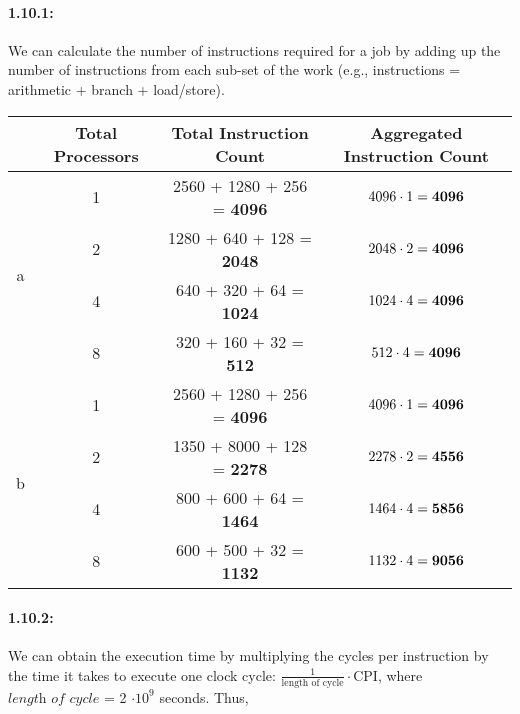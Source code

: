 \documentclass[a4paper]{article}
\begin{document}
\paragraph*{1.10.1:} We can calculate the number of instructions required for a job by adding up the number of instructions from each sub-set of the work (e.g., instructions = arithmetic + branch + load/store).

\begin{center}
\begin{tabular}{|c|c|c|c|c|c|}
\hline
& Total Processors & \multicolumn{2}{|c|}{Total Instruction Count} & \multicolumn{2}{|c|}{Aggregated Instruction Count}\\
\hline
\hline
\multirow{4}{*}{a} & 1 & \multicolumn{2}{|c|}{2560 + 1280 + 256 = {\bf4096}} & \multicolumn{2}{|c|}{$4096 \cdot 1 = {\bf4096}$}\\
& 2 & \multicolumn{2}{|c|}{1280 + 640 + 128 = {\bf2048}} & \multicolumn{2}{|c|}{$2048 \cdot 2 = {\bf4096}$}\\
& 4 & \multicolumn{2}{|c|}{640 + 320 + 64 = {\bf1024}} & \multicolumn{2}{|c|}{$1024 \cdot 4 = {\bf4096}$}\\
& 8 & \multicolumn{2}{|c|}{320 + 160 + 32 = {\bf512}} & \multicolumn{2}{|c|}{$512 \cdot 4 = {\bf4096}$}\\
\hline
\hline
\multirow{4}{*}{b} & 1 & \multicolumn{2}{|c|}{2560 + 1280 + 256 = {\bf4096}} & \multicolumn{2}{|c|}{$4096 \cdot 1 = {\bf4096}$}\\
& 2 & \multicolumn{2}{|c|}{1350 + 8000 + 128 = {\bf2278}} & \multicolumn{2}{|c|}{$2278 \cdot 2 = {\bf4556}$}\\
& 4 & \multicolumn{2}{|c|}{800 + 600 + 64 = {\bf1464}} & \multicolumn{2}{|c|}{$1464 \cdot 4 = {\bf5856}$}\\
& 8 & \multicolumn{2}{|c|}{600 + 500 + 32 = {\bf1132}} & \multicolumn{2}{|c|}{$1132 \cdot 4 = {\bf9056}$}\\
\hline
\end{tabular}
\end{center}

\paragraph*{1.10.2:} We can obtain the execution time by multiplying the cycles per instruction by the time it takes to execute one clock cycle: $\frac{1}{\mbox{length of cycle}} \cdot \mbox{CPI}$, where $\textit{length of cycle}$ = 2 $\cdot 10^9$ seconds. Thus, 
\end{document}
